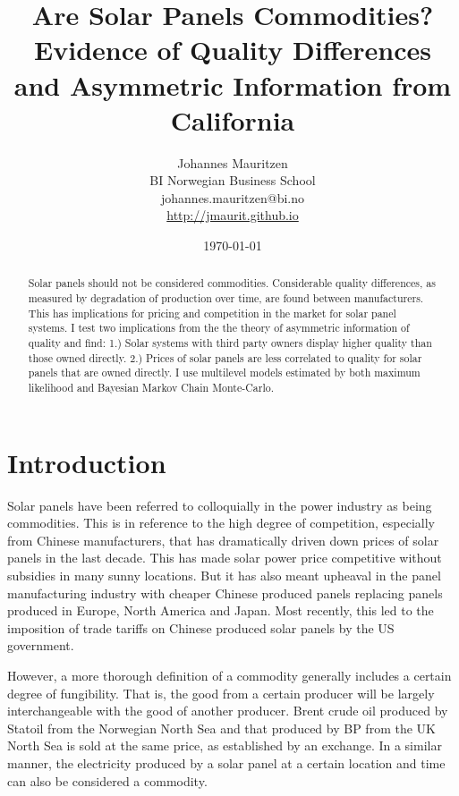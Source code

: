 \documentclass[12pt]{article}
\title{Are Solar Panels Commodities? Evidence of Quality Differences and Asymmetric Information from California}
\date{\today}
\author{Johannes Mauritzen \\ BI Norwegian Business School \\ johannes.mauritzen@bi.no\\\url{http://jmaurit.github.io}}
\begin{document}
 \begin{spacing}{1} %
	\maketitle

\begin{abstract}
 Solar panels should not be considered commodities. Considerable quality differences, as measured by degradation of production over time, are found between manufacturers. This has implications for pricing and competition in the market for solar panel systems. I test two implications from the the theory of asymmetric information of quality and find: 1.) Solar systems with third party owners display higher quality than those owned directly. 2.) Prices of solar panels are less correlated to quality for solar panels that are owned directly. I use multilevel models estimated by both maximum likelihood and Bayesian Markov Chain Monte-Carlo.
\end{abstract}

 \end{spacing}

\section{Introduction}

Solar panels have been referred to colloquially in the power industry as being commodities. This is in reference to the high degree of competition, especially from Chinese manufacturers, that has dramatically driven down prices of solar panels in the last decade. This has made solar power price competitive without subsidies in many sunny locations. But it has also meant upheaval in the panel manufacturing industry with cheaper Chinese produced panels replacing panels produced in Europe, North America and Japan. Most recently, this led to the imposition of trade tariffs on Chinese produced solar panels by the US government.

However, a more thorough definition of a commodity generally includes a certain degree of fungibility. That is, the good from a certain producer will be largely interchangeable with the good of another producer. Brent crude oil produced by Statoil from the Norwegian North Sea and that produced by BP from the UK North Sea is sold at the same price, as established by an exchange. In a similar manner, the electricity produced by a solar panel at a certain location and time can also be considered a commodity.
\end{document}
